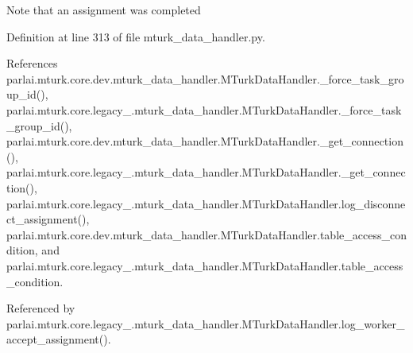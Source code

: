 \begin{DoxyVerb}Note that an assignment was completed\end{DoxyVerb}
 

Definition at line 313 of file mturk\+\_\+data\+\_\+handler.\+py.



References parlai.\+mturk.\+core.\+dev.\+mturk\+\_\+data\+\_\+handler.\+M\+Turk\+Data\+Handler.\+\_\+force\+\_\+task\+\_\+group\+\_\+id(), parlai.\+mturk.\+core.\+legacy\+\_.\+mturk\+\_\+data\+\_\+handler.\+M\+Turk\+Data\+Handler.\+\_\+force\+\_\+task\+\_\+group\+\_\+id(), parlai.\+mturk.\+core.\+dev.\+mturk\+\_\+data\+\_\+handler.\+M\+Turk\+Data\+Handler.\+\_\+get\+\_\+connection(), parlai.\+mturk.\+core.\+legacy\+\_.\+mturk\+\_\+data\+\_\+handler.\+M\+Turk\+Data\+Handler.\+\_\+get\+\_\+connection(), parlai.\+mturk.\+core.\+legacy\+\_.\+mturk\+\_\+data\+\_\+handler.\+M\+Turk\+Data\+Handler.\+log\+\_\+disconnect\+\_\+assignment(), parlai.\+mturk.\+core.\+dev.\+mturk\+\_\+data\+\_\+handler.\+M\+Turk\+Data\+Handler.\+table\+\_\+access\+\_\+condition, and parlai.\+mturk.\+core.\+legacy\+\_.\+mturk\+\_\+data\+\_\+handler.\+M\+Turk\+Data\+Handler.\+table\+\_\+access\+\_\+condition.



Referenced by parlai.\+mturk.\+core.\+legacy\+\_.\+mturk\+\_\+data\+\_\+handler.\+M\+Turk\+Data\+Handler.\+log\+\_\+worker\+\_\+accept\+\_\+assignment().

